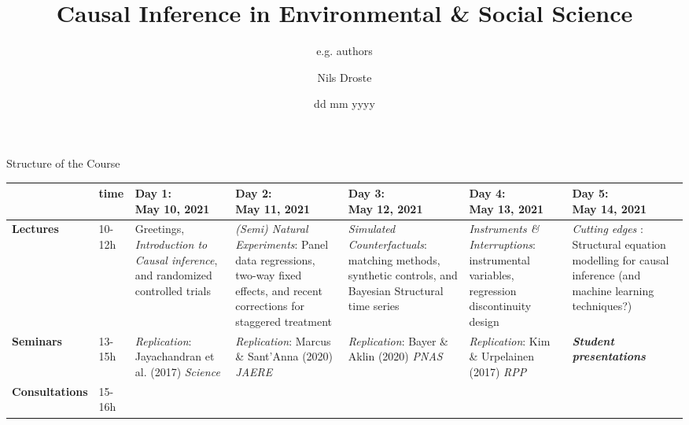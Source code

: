 \documentclass[aspectratio=169]{beamer}
\title[Causal Inference]{Causal Inference in Environmental \& \newline Social Science }
\author{Nils Droste}
\subtitle{e.g. authors}
\date{dd mm yyyy}
\institute{Lund University\\Department for Political Science}
\begin{document}

\titleframe



	\begin{frame}{Structure of the Course}
		\begin{table} \tiny
			\begin{tabular}{|p{1.25cm}|p{.75cm}|p{1.3cm}|p{1.3cm}|p{1.3cm}|p{1.3cm}|p{1.3cm}|}
				\hline

					& \textbf{time}
					&	\thead{ \textbf{Day 1:} \\  May 10, 2021}
					& \thead{ \textbf{Day 2:} \\  May 11, 2021}
					& \thead{ \textbf{Day 3:} \\  May 12, 2021}
					& \thead{ \textbf{Day 4:} \\  May 13, 2021}
					& \thead{ \textbf{Day 5:} \\  May 14, 2021}
					\\
				\hline
					\textbf{Lectures}
					& 10-12h
					& Greetings, \textit{Introduction to Causal inference}, and randomized controlled trials
					& \textit{(Semi) Natural Experiments}: Panel data regressions, two-way fixed effects, and recent corrections for staggered treatment
					& \textit{Simulated Counterfactuals}: matching methods, synthetic controls, and Bayesian Structural time series
					& \textit{Instruments \& Interruptions}: instrumental variables, regression discontinuity design
					& \textit{Cutting edges} : Structural equation modelling for causal inference (and machine learning techniques?)
					\\
				\hline
				 	\textbf{Seminars}
					& 13-15h
					& \textit{Replication}: Jayachandran et al. (2017) \textit{Science}
					& \textit{Replication}: Marcus \& Sant'Anna (2020) \textit{JAERE}
					& \textit{Replication}: Bayer \& Aklin (2020) \textit{PNAS}
					& \textit{Replication}: Kim \& Urpelainen (2017) \textit{RPP}
					& \textit{\textbf{Student presentations}}
					\\
				\hline
					\textbf{Consultations}
					& 15-16h
					& \thead{ \\ }
					& \thead{ \\ }
					& \thead{ \\ }
					& \thead{ \\ }
					& \thead{ \\ }
					\\
				\hline
			\end{tabular}
		\end{table}
	\end{frame}
\end{document}
